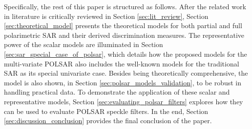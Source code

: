 \documentclass[journal]{IEEEtran}
\begin{document}

Specifically, the rest of this paper is structured as follows.
After the related work in literature is critically reviewed in Section \ref{sec:lit_review},
  Section \ref{sec:theoretical_model} presents the theoretical models for both partial and full polarimetric SAR and their derived discrimination measures.
The representative power of the scalar models are illuminated in Section \ref{sec:sar_special_case_of_polsar},
  which details how the proposed models for the multi-variate POLSAR also includes the well-known models for the traditional SAR as its special univariate case.
Besides being theoretically comprehensive, 
  the model is also shown, in Section \ref{sec:polsar_models_validation}, %
  to be robust in handling practical data. %
To demonstrate the application of these scalar and representative models, 
  Section \ref{sec:evaluating_polsar_filters} explores how they can be used to evaluate POLSAR speckle filters.   
In the end, Section \ref{sec:discussion_conclusion} provides the final conclusion of the paper.
\end{document}
